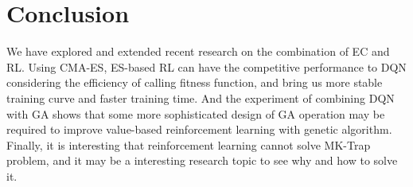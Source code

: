 \documentclass[a4paper]{article}
\begin{document}
\section{Conclusion}
\label{sec:conclusion}

We have explored and extended recent research on the combination of EC and RL. Using CMA-ES, ES-based RL can have the competitive performance to DQN considering the efficiency of calling fitness function, and bring us more stable training curve and faster training time. And the experiment of combining DQN with GA shows that some more sophisticated design of GA operation may be required to improve value-based reinforcement learning with genetic algorithm. Finally, it is interesting that reinforcement learning cannot solve MK-Trap problem, and it may be a interesting research topic to see why and how to solve it.



\end{document}
